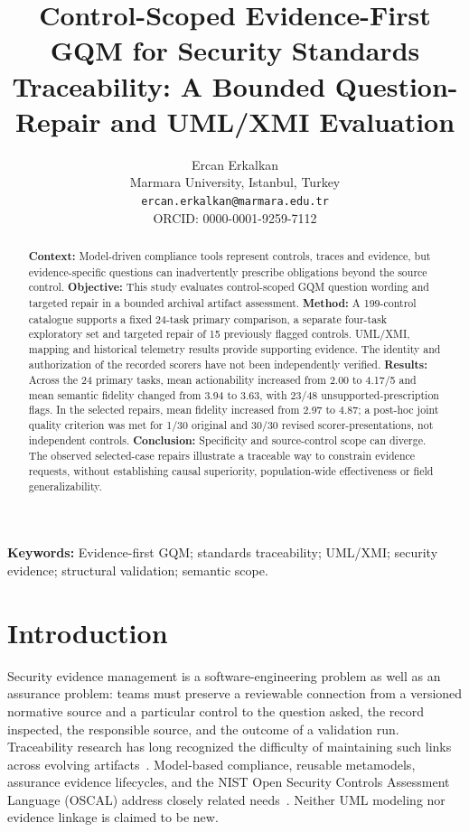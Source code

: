 \documentclass[12pt,a4paper]{article}
\title{Control-Scoped Evidence-First GQM for Security Standards Traceability: A Bounded Question-Repair and UML/XMI Evaluation}
\author{Ercan Erkalkan\\\small Marmara University, Istanbul, Turkey\\\small \texttt{ercan.erkalkan@marmara.edu.tr}\\\small ORCID: 0000-0001-9259-7112}
\date{}
\begin{document}
\maketitle
\begin{abstract}
\noindent\textbf{Context:} Model-driven compliance tools represent controls, traces and evidence, but evidence-specific questions can inadvertently prescribe obligations beyond the source control. \textbf{Objective:} This study evaluates control-scoped GQM question wording and targeted repair in a bounded archival artifact assessment. \textbf{Method:} A 199-control catalogue supports a fixed 24-task primary comparison, a separate four-task exploratory set and targeted repair of 15 previously flagged controls. UML/XMI, mapping and historical telemetry results provide supporting evidence. The identity and authorization of the recorded scorers have not been independently verified. \textbf{Results:} Across the 24 primary tasks, mean actionability increased from 2.00 to 4.17/5 and mean semantic fidelity changed from 3.94 to 3.63, with 23/48 unsupported-prescription flags. In the selected repairs, mean fidelity increased from 2.97 to 4.87; a post-hoc joint quality criterion was met for 1/30 original and 30/30 revised scorer-presentations, not independent controls. \textbf{Conclusion:} Specificity and source-control scope can diverge. The observed selected-case repairs illustrate a traceable way to constrain evidence requests, without establishing causal superiority, population-wide effectiveness or field generalizability.
\end{abstract}
\noindent\textbf{Keywords:} Evidence-first GQM; standards traceability; UML/XMI; security evidence; structural validation; semantic scope.\par\medskip
\section{Introduction}
Security evidence management is a software-engineering problem as well as an assurance problem: teams must preserve a reviewable connection from a versioned normative source and a particular control to the question asked, the record inspected, the responsible source, and the outcome of a validation run. Traceability research has long recognized the difficulty of maintaining such links across evolving artifacts~\cite{Gotel1994Traceability,RameshJarke2001Traceability}. Model-based compliance, reusable metamodels, assurance evidence lifecycles, and the NIST Open Security Controls Assessment Language (OSCAL) address closely related needs~\cite{PanesarWalawege2013IST,DelaVara2016IST,DelaVara2022SoSyM,NIST_OSCAL_2026}. Neither UML modeling nor evidence linkage is claimed to be new.
\end{document}
